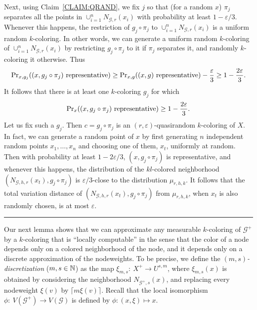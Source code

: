 \documentclass{article}
\newenvironment{proof}{{\bf Proof.}}{\hfill\rule{2mm}{2mm}\medskip}
\def\GG{\mathcal{G}}\def\HH{\mathcal{H}}\def\II{\mathcal{I}}
\def\eps{\varepsilon}
\def\Pr {{\rm Pr}}
\begin{document}
\begin{proof}
Next, using Claim~\ref{CLAIM:QRAND}, we fix $j$ so that (for a random $x$)
$\pi_j$
separates all the points in $\cup_{i=1}^n N_{\GG,r}(x_i)$ with
probability at least $1-\eps/3$. Whenever this happens, the
restriction of $g_j\circ \pi_j$ to $\cup_{i=1}^n N_{\GG,r}(x_i)$ is a
uniform random $k$-coloring. In  other words, we can generate a
uniform random $k$-coloring of $\cup_{i=1}^n N_{\GG,r}(x_i)$ by
restricting $g_j\circ \pi_j$ to it if $\pi_j$ separates it, and
randomly $k$-coloring it otherwise. Thus
\[
\Pr_{x,g_j}((x,g_j\circ \pi_j)~\text{representative}) \ge
\Pr_{x,g}((x,g)~\text{representative})-\frac\eps3\ge 1-\frac{2\eps}3.
\]
It follows that there is at least one $k$-coloring $g_j$ for which
\[
\Pr_x((x,g_j\circ \pi_j)~\text{representative}) \ge 1-\frac{2\eps}3.
\]
Let us fix such a $g_j$. Then $c=g_j\circ \pi_j$ is an
$(r,\eps)$-quasirandom $k$-coloring of $X$. In fact, we can generate
a random point of $x$ by first generating $n$ independent random
points $x_1,\dots,x_n$ and choosing one of them, $x_t$, uniformly at
random. Then with probability at least $1-2\eps/3$, $(x,g_j \circ \pi_j
)$ is representative, and whenever this happens,  the
distribution of the $kl$-colored neighborhood
$(N_{\GG,h,r}(x_t),g_j\circ \pi_j)$ is $\eps/3$-close to the
distribution $\mu_{r,h,k}$. It follows that the total variation
distance of $(N_{\GG,h,r}(x_t),g_j\circ \pi_j)$ from $\mu_{r,h,k}$,
when $x_t$ is also randomly chosen, is at most $\eps$.
\end{proof}

Our next lemma shows that we can approximate any measurable
$k$-coloring of $\GG^+$ by a $k$-coloring that is {``locally
computable'' in the sense that the color of a node depends only on a
colored neighborhood of the node, and it depends only on a discrete
approximation of the nodeweights.} To be precise, we define the
\emph{$(m,s)$-discretization} ($m,s\in\mathbb{N}$) as the map
$\xi_{m,s}:~X^+\to U^{s,m}$, where $\xi_{m,s}(x)$ is obtained by
considering the neighborhood $N_{\GG^+,s}(x)$, and replacing every
nodeweight $\xi(v)$ by $\lceil m \xi(v)\rceil$. Recall that the local
isomorphism $\phi:~V(\GG^+)\to V(\GG)$ is defined by $\phi:(x,\xi)
\mapsto x$.
\end{document}
